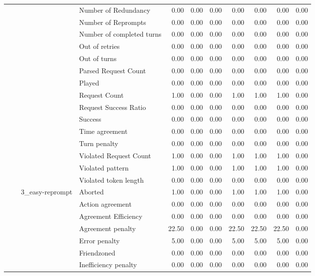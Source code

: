 \begin{tabular}{llllrrrrrrr}
 &  &  & Number of Redundancy & 0.00 & 0.00 & 0.00 & 0.00 & 0.00 & 0.00 & 0.00 \\
 &  &  & Number of Reprompts & 0.00 & 0.00 & 0.00 & 0.00 & 0.00 & 0.00 & 0.00 \\
 &  &  & Number of completed turns & 0.00 & 0.00 & 0.00 & 0.00 & 0.00 & 0.00 & 0.00 \\
 &  &  & Out of retries & 0.00 & 0.00 & 0.00 & 0.00 & 0.00 & 0.00 & 0.00 \\
 &  &  & Out of turns & 0.00 & 0.00 & 0.00 & 0.00 & 0.00 & 0.00 & 0.00 \\
 &  &  & Parsed Request Count & 0.00 & 0.00 & 0.00 & 0.00 & 0.00 & 0.00 & 0.00 \\
 &  &  & Played & 0.00 & 0.00 & 0.00 & 0.00 & 0.00 & 0.00 & 0.00 \\
 &  &  & Request Count & 1.00 & 0.00 & 0.00 & 1.00 & 1.00 & 1.00 & 0.00 \\
 &  &  & Request Success Ratio & 0.00 & 0.00 & 0.00 & 0.00 & 0.00 & 0.00 & 0.00 \\
 &  &  & Success & 0.00 & 0.00 & 0.00 & 0.00 & 0.00 & 0.00 & 0.00 \\
 &  &  & Time agreement & 0.00 & 0.00 & 0.00 & 0.00 & 0.00 & 0.00 & 0.00 \\
 &  &  & Turn penalty & 0.00 & 0.00 & 0.00 & 0.00 & 0.00 & 0.00 & 0.00 \\
 &  &  & Violated Request Count & 1.00 & 0.00 & 0.00 & 1.00 & 1.00 & 1.00 & 0.00 \\
 &  &  & Violated pattern & 1.00 & 0.00 & 0.00 & 1.00 & 1.00 & 1.00 & 0.00 \\
 &  &  & Violated token length & 0.00 & 0.00 & 0.00 & 0.00 & 0.00 & 0.00 & 0.00 \\
\cline{3-11}
 &  & \multirow[t]{27}{*}{3_easy-reprompt} & Aborted & 1.00 & 0.00 & 0.00 & 1.00 & 1.00 & 1.00 & 0.00 \\
 &  &  & Action agreement & 0.00 & 0.00 & 0.00 & 0.00 & 0.00 & 0.00 & 0.00 \\
 &  &  & Agreement Efficiency & 0.00 & 0.00 & 0.00 & 0.00 & 0.00 & 0.00 & 0.00 \\
 &  &  & Agreement penalty & 22.50 & 0.00 & 0.00 & 22.50 & 22.50 & 22.50 & 0.00 \\
 &  &  & Error penalty & 5.00 & 0.00 & 0.00 & 5.00 & 5.00 & 5.00 & 0.00 \\
 &  &  & Friendzoned & 0.00 & 0.00 & 0.00 & 0.00 & 0.00 & 0.00 & 0.00 \\
 &  &  & Inefficiency penalty & 0.00 & 0.00 & 0.00 & 0.00 & 0.00 & 0.00 & 0.00 \\

\end{tabular}
